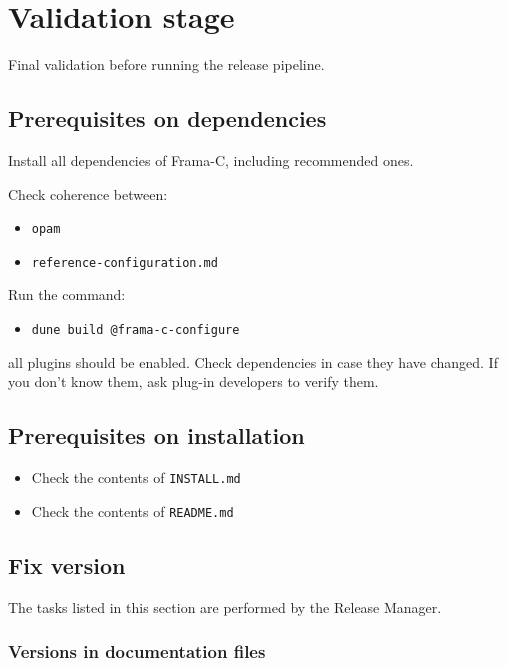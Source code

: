 \chapter{Validation stage}
\label{chap:validation}

Final validation before running the release pipeline.

\section{Prerequisites on dependencies}

Install all dependencies of Frama-C, including recommended ones.

Check coherence between:
\begin{itemize}
  \item \texttt{opam} 
  \item \texttt{reference-configuration.md} 
\end{itemize}

Run the command:
\begin{itemize}
  \item \texttt{dune build @frama-c-configure}
\end{itemize}
all plugins should be enabled. Check dependencies in case they have changed.
If you don't know them, ask plug-in developers to verify them.

\section{Prerequisites on installation}

\begin{itemize}
  \item Check the contents of \texttt{INSTALL.md} 
  \item Check the contents of \texttt{README.md} 
\end{itemize}

\section{Fix version}

The tasks listed in this section are performed by the Release Manager.

\subsection{Versions in documentation files}

